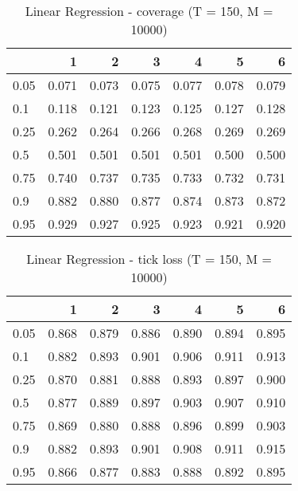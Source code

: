 \documentclass{article}
\begin{document}
\begin{table}[h!]
\centering
\caption{Linear Regression - coverage (T = 150, M = 10000)}
\label{tab: Linear Regression cov}
\begin{tabular}{lrrrrrr}
\toprule
 & 1 & 2 & 3 & 4 & 5 & 6 \\
\midrule
0.05 & 0.071 & 0.073 & 0.075 & 0.077 & 0.078 & 0.079 \\
0.1 & 0.118 & 0.121 & 0.123 & 0.125 & 0.127 & 0.128 \\
0.25 & 0.262 & 0.264 & 0.266 & 0.268 & 0.269 & 0.269 \\
0.5 & 0.501 & 0.501 & 0.501 & 0.501 & 0.500 & 0.500 \\
0.75 & 0.740 & 0.737 & 0.735 & 0.733 & 0.732 & 0.731 \\
0.9 & 0.882 & 0.880 & 0.877 & 0.874 & 0.873 & 0.872 \\
0.95 & 0.929 & 0.927 & 0.925 & 0.923 & 0.921 & 0.920 \\
\bottomrule
\end{tabular}
\end{table}

\begin{table}[h!]
\centering
\caption{Linear Regression - tick loss (T = 150, M = 10000)}
\label{tab: Linear Regression tic}
\begin{tabular}{lrrrrrr}
\toprule
 & 1 & 2 & 3 & 4 & 5 & 6 \\
\midrule
0.05 & 0.868 & 0.879 & 0.886 & 0.890 & 0.894 & 0.895 \\
0.1 & 0.882 & 0.893 & 0.901 & 0.906 & 0.911 & 0.913 \\
0.25 & 0.870 & 0.881 & 0.888 & 0.893 & 0.897 & 0.900 \\
0.5 & 0.877 & 0.889 & 0.897 & 0.903 & 0.907 & 0.910 \\
0.75 & 0.869 & 0.880 & 0.888 & 0.896 & 0.899 & 0.903 \\
0.9 & 0.882 & 0.893 & 0.901 & 0.908 & 0.911 & 0.915 \\
0.95 & 0.866 & 0.877 & 0.883 & 0.888 & 0.892 & 0.895 \\
\bottomrule
\end{tabular}
\end{table}
\end{document}
